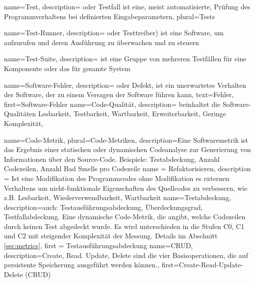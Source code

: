  {
  name={Test},
  description= {oder Testfall ist eine, meist automatisierte, Prüfung des Programmverhaltens bei definierten Eingabeparametern},
  plural=Tests
}

 {
  name={Test-Runner},
  description= {oder Testtreiber) ist eine Software, um  aufzurufen und deren Ausführung zu überwachen und zu steuern}
}

 {
  name={Test-Suite},
  description= {ist eine Gruppe von mehreren Testfällen für eine Komponente oder das für gesamte System}
}

 {
  name={Software-Fehler},
  description= {oder Defekt, ist ein unerwartetes Verhalten der Software, der zu einem Versagen der Software führen kann},
text=Fehler,
first={Software-Fehler}
}
 {
  name={Code-Qualität},
  description= {beinhaltet die Software-Qualitäten Lesbarkeit, Testbarkeit, Wartbarkeit, Erweiterbarkeit, Geringe Komplexität},
}

 {
  name={Code-Metrik},
  plural={Code-Metriken},
  description={Eine Softwaremetrik ist das Ergebnis einer statischen oder dynamischen Codeanalyse zur Generierung von Informationen über den Source-Code. Beispiele: Testabdeckung, Anzahl Codezeilen, Anzahl Bad Smells pro Codezeile}
}
 {
  name = {Refaktorisieren},
  description = {Ist eine Modifikation des Programmcodes ohne Modifikation es externen Verhaltens um nicht-funktionale Eigenschaften des Quellcodes zu verbessern, wie z.B. Lesbarkeit, Wiederverwendbarkeit, Wartbarkeit}
}
 {
  name=Testabdeckung,
  description={auch: Testausführungsabdeckung, Überdeckungsgrad, Testfallabdeckung. Eine dynamische Code-Metrik, die angibt, welche Codezeilen durch keinen Test abgedeckt wurde. Es wird unterschieden in die Stufen C0, C1 und C2 mit steigender Komplexität der Messung. Details im Abschnitt \ref{sec:metrics}},
  first = {Testausführungsabdeckung}
}
 {
  name={CRUD},
  description={Create, Read. Update, Delete sind die vier Basisoperationen, die auf persistente Speicherung ausgeführt werden können.},
  first={Create-Read-Update-Delete (CRUD)}
}

